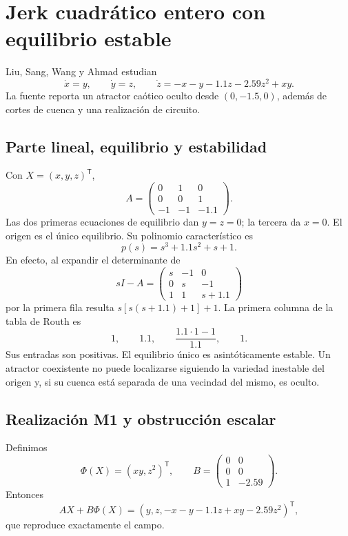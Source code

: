 \section{Jerk cuadrático entero con equilibrio estable}
\label{sec:cand-jerk}

Liu, Sang, Wang y Ahmad \cite{liu2021} estudian
\begin{equation}
 \dot x=y,\qquad
 \dot y=z,\qquad
 \dot z=-x-y-1.1z-2.59z^2+xy.
 \label{eq:cand-jerk}
\end{equation}
La fuente reporta un atractor caótico oculto desde
\((0,-1.5,0)\), además de cortes de cuenca y una realización de circuito.

\subsection{Parte lineal, equilibrio y estabilidad}

Con \(X=(x,y,z)^{\mathsf T}\),
\begin{equation}
 A=\begin{pmatrix}
 0&1&0\\0&0&1\\-1&-1&-1.1
 \end{pmatrix}.
 \label{eq:cand-jerk-A}
\end{equation}
Las dos primeras ecuaciones de equilibrio dan \(y=z=0\); la tercera da
\(x=0\). El origen es el único equilibrio. Su polinomio característico es
\begin{equation}
 p(s)=s^3+1.1s^2+s+1.
 \label{eq:cand-jerk-charpoly}
\end{equation}
En efecto, al expandir el determinante de
\[
 sI-A=\begin{pmatrix}s&-1&0\\0&s&-1\\1&1&s+1.1\end{pmatrix}
\]
por la primera fila resulta \(s[s(s+1.1)+1]+1\).
La primera columna de la tabla de Routh es
\[
 1,\qquad 1.1,\qquad \frac{1.1\cdot1-1}{1.1},\qquad 1.
\]
Sus entradas son positivas. El equilibrio único es
asintóticamente estable. Un atractor coexistente no puede localizarse
siguiendo la variedad inestable del origen y, si su cuenca está separada de una
vecindad del mismo, es oculto.

\subsection{Realización M1 y obstrucción escalar}

Definimos
\[
 \Phi(X)=(xy,z^2)^{\mathsf T},\qquad
 B=\begin{pmatrix}0&0\\0&0\\1&-2.59\end{pmatrix}.
\]
Entonces
\[
 AX+B\Phi(X)=
 (y,z,-x-y-1.1z+xy-2.59z^2)^{\mathsf T},
\]
que reproduce exactamente el campo.

